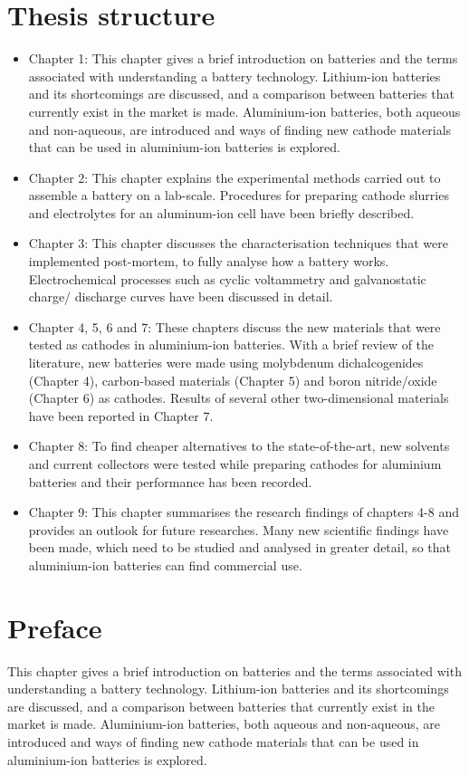 \newpage
\section*{Thesis structure}
\begin{itemize}
    \item Chapter 1: This chapter gives a brief introduction on batteries and the terms associated with understanding a battery technology. Lithium-ion batteries and its shortcomings are discussed, and a comparison between batteries that currently exist in the market is made. Aluminium-ion batteries, both aqueous and non-aqueous, are introduced and ways of finding new cathode materials that can be used in aluminium-ion batteries is explored.
    \item Chapter 2: This chapter explains the experimental methods carried out to assemble a battery on a lab-scale. Procedures for preparing cathode slurries and electrolytes for an aluminum-ion cell have been briefly described.  
    \item Chapter 3: This chapter discusses the characterisation techniques that were implemented post-mortem, to fully analyse how a battery works. Electrochemical processes such as cyclic voltammetry and galvanostatic charge/ discharge curves have been discussed in detail.   
    \item Chapter 4, 5, 6 and 7: These chapters discuss the new materials that were tested as cathodes in aluminium-ion batteries. With a brief review of the literature, new batteries were made using molybdenum dichalcogenides (Chapter 4), carbon-based materials (Chapter 5) and boron nitride/oxide (Chapter 6) as cathodes. Results of several other two-dimensional materials have been reported in Chapter 7. 
    \item Chapter 8: To find cheaper alternatives to the state-of-the-art, new solvents and current collectors were tested while preparing cathodes for aluminium batteries and their performance has been recorded.   
    \item Chapter 9: This chapter summarises the research findings of chapters 4-8 and provides an outlook for future researches. Many new scientific findings have been made, which need to be studied and analysed in greater detail, so that aluminium-ion batteries can find commercial use.
    \end{itemize}
\newpage
\section*{Preface}
This chapter gives a brief introduction on batteries and the terms associated with understanding a battery technology. Lithium-ion batteries and its shortcomings are discussed, and a comparison between batteries that currently exist in the market is made. Aluminium-ion batteries, both aqueous and non-aqueous, are introduced and ways of finding new cathode materials that can be used in aluminium-ion batteries is explored.
\newpage

